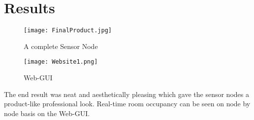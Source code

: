 \chapter{Results}

\begin{figure}[ht]
\begin{center}

\texttt{[image: FinalProduct.jpg]}

\caption{A complete Sensor Node}

\end{center}
\end{figure}


\newpage 

\begin{figure}[ht]
\begin{center}

\texttt{[image: Website1.png]}
\caption{Web-GUI}

\label{fig:Site2}
\end{center}
\end{figure}

\par The end result was neat and aesthetically pleasing which gave the sensor nodes a product-like professional look. Real-time room occupancy can be seen on node by node basis on the Web-GUI.



